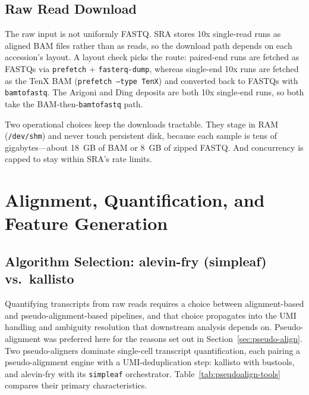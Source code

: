 \subsection*{Raw Read Download}\label{sec:download}

The raw input is not uniformly FASTQ. SRA stores 10x single-read runs as aligned BAM files rather than as reads, so the download path depends on each accession's layout. A layout check picks the route: paired-end runs are fetched as FASTQs via \texttt{prefetch} + \texttt{fasterq-dump}, whereas single-end 10x runs are fetched as the TenX BAM (\texttt{prefetch --type TenX}) and converted back to FASTQs with \texttt{bamtofastq}\cite{leinonen2011sra}. The Arigoni and Ding deposits are both 10x single-end runs, so both take the BAM-then-\texttt{bamtofastq} path.

Two operational choices keep the downloads tractable. They stage in RAM (\texttt{/dev/shm}) and never touch persistent disk, because each sample is tens of gigabytes---about 18~GB of BAM or 8~GB of zipped FASTQ. And concurrency is capped to stay within SRA's rate limits.

\section{Alignment, Quantification, and Feature Generation}\label{sec:pipeline}

\subsection*{Algorithm Selection: alevin-fry (simpleaf) vs.\ kallisto}

Quantifying transcripts from raw reads requires a choice between alignment-based and pseudo-alignment-based pipelines, and that choice propagates into the UMI handling and ambiguity resolution that downstream analysis depends on. Pseudo-alignment was preferred here for the reasons set out in Section~\ref{sec:pseudo-align}. Two pseudo-aligners dominate single-cell transcript quantification, each pairing a pseudo-alignment engine with a UMI-deduplication step: kallisto with bustools, and alevin-fry with its \texttt{simpleaf} orchestrator. Table~\ref{tab:pseudoalign-tools} compares their primary characteristics.

